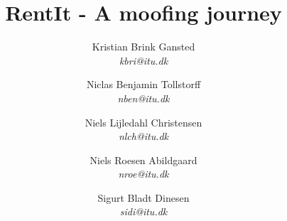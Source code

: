 \title{RentIt - A moofing journey}
\author{Kristian Brink Gansted\\ \emph{kbri@itu.dk}
    \and Niclas Benjamin Tollstorff\\ \emph{nben@itu.dk}
    \and Niels Lijledahl Christensen\\ \emph{nlch@itu.dk}
    \and Niels Roesen Abildgaard\\ \emph{nroe@itu.dk}
    \and Sigurt Bladt Dinesen\\ \emph{sidi@itu.dk}}

\maketitle
